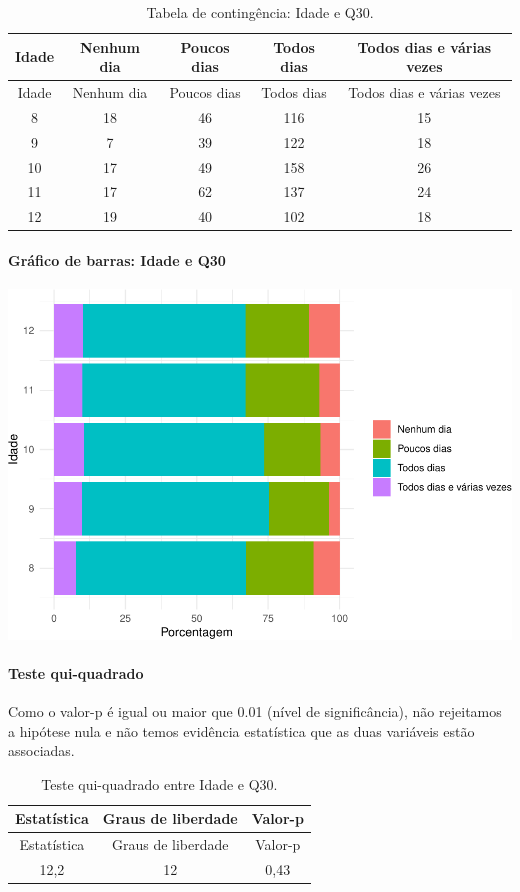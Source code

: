 \documentclass[]{article}
\let\oldparagraph\paragraph
\renewcommand{\paragraph}[1]{\oldparagraph{#1}\mbox{}}
\begin{document}
\begin{longtable}[]{@{}ccccc@{}}
\caption{\label{tab:unnamed-chunk-977}Tabela de contingência: Idade e Q30.}\tabularnewline
\toprule
Idade & Nenhum dia & Poucos dias & Todos dias & Todos dias e várias vezes\tabularnewline
\midrule
\endfirsthead
\toprule
Idade & Nenhum dia & Poucos dias & Todos dias & Todos dias e várias vezes\tabularnewline
\midrule
\endhead
8 & 18 & 46 & 116 & 15\tabularnewline
9 & 7 & 39 & 122 & 18\tabularnewline
10 & 17 & 49 & 158 & 26\tabularnewline
11 & 17 & 62 & 137 & 24\tabularnewline
12 & 19 & 40 & 102 & 18\tabularnewline
\bottomrule
\end{longtable}

\hypertarget{gruxe1fico-de-barras-idade-e-q30}{%
\paragraph{Gráfico de barras: Idade e Q30}\label{gruxe1fico-de-barras-idade-e-q30}}

\begin{center}\includegraphics[width=0.75\linewidth]{relatorio_covid19_files/figure-latex/unnamed-chunk-978-1} \end{center}

\hypertarget{teste-qui-quadrado-84}{%
\paragraph{Teste qui-quadrado}\label{teste-qui-quadrado-84}}

Como o valor-p é igual ou maior que 0.01 (nível de significância), não rejeitamos a hipótese nula e não temos evidência estatística que as duas variáveis estão associadas.

\begin{longtable}[]{@{}ccc@{}}
\caption{\label{tab:unnamed-chunk-980}Teste qui-quadrado entre Idade e Q30.}\tabularnewline
\toprule
Estatística & Graus de liberdade & Valor-p\tabularnewline
\midrule
\endfirsthead
\toprule
Estatística & Graus de liberdade & Valor-p\tabularnewline
\midrule
\endhead
12,2 & 12 & 0,43\tabularnewline
\bottomrule
\end{longtable}
\end{document}
